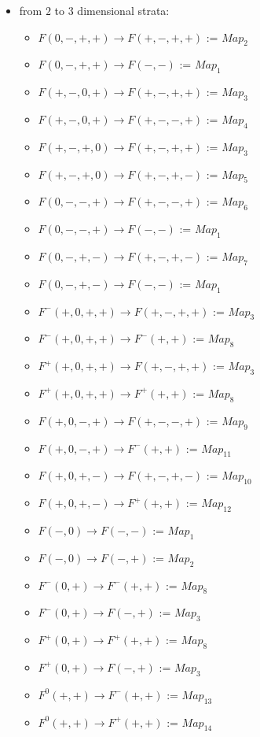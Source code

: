 \begin{itemize}
\item from $2$ to $3$ dimensional strata:
\begin{itemize}
\item $F(0,-,+,+)\rightarrow F(+,-,+,+)$ := $Map_2$
\item $F(0,-,+,+)\rightarrow F(-,-)$ := $Map_1$
\item $F(+,-,0,+)\rightarrow F(+,-,+,+)$ := $Map_3$
\item $F(+,-,0,+)\rightarrow F(+,-,-,+)$ := $Map_4$
\item $F(+,-,+,0)\rightarrow F(+,-,+,+)$ := $Map_3$
\item $F(+,-,+,0)\rightarrow F(+,-,+,-)$ := $Map_5$
\item $F(0,-,-,+)\rightarrow F(+,-,-,+)$ := $Map_6$
\item $F(0,-,-,+)\rightarrow F(-,-)$ := $Map_1$
\item $F(0,-,+,-)\rightarrow F(+,-,+,-)$ := $Map_7$
\item $F(0,-,+,-)\rightarrow F(-,-)$ := $Map_1$
\item $F^-(+,0,+,+)\rightarrow F(+,-,+,+)$ := $Map_3$
\item $F^-(+,0,+,+)\rightarrow F^-(+,+)$ := $Map_8$
\item $F^+(+,0,+,+)\rightarrow F(+,-,+,+)$ := $Map_3$
\item $F^+(+,0,+,+)\rightarrow F^+(+,+)$ := $Map_8$
\item $F(+,0,-,+)\rightarrow F(+,-,-,+)$ := $Map_9$
\item $F(+,0,-,+)\rightarrow F^-(+,+)$ := $Map_{11}$
\item $F(+,0,+,-)\rightarrow F(+,-,+,-)$ := $Map_{10}$
\item $F(+,0,+,-)\rightarrow F^+(+,+)$ := $Map_{12}$
\item $F(-,0)\rightarrow F(-,-)$ := $Map_1$
\item $F(-,0)\rightarrow F(-,+)$ := $Map_2$
\item $F^-(0,+)\rightarrow F^-(+,+)$ := $Map_8$
\item $F^-(0,+)\rightarrow F(-,+)$ := $Map_3$
\item $F^+(0,+)\rightarrow F^+(+,+)$ := $Map_8$
\item $F^+(0,+)\rightarrow F(-,+)$ := $Map_3$
\item $F^0(+,+)\rightarrow F^-(+,+)$ := $Map_{13}$
\item $F^0(+,+)\rightarrow F^+(+,+)$ := $Map_{14}$

\end{itemize}
\end{itemize}

